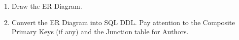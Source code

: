 \documentclass[12pt,a4paper]{article}
\begin{document}
\begin{enumerate}
    \item Draw the ER Diagram.
    \item Convert the ER Diagram into SQL DDL. Pay attention to the Composite Primary Keys (if any) and the Junction table for Authors.
\end{enumerate}








\end{document}
